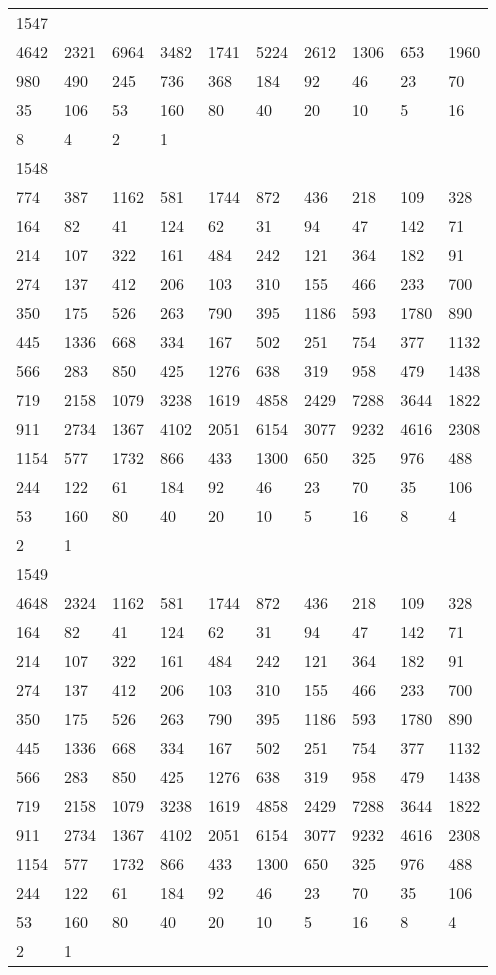 \begin{longtable}{*{10}{l}}
1547&&&&&&&&&\\
4642& 2321& 6964& 3482& 1741& 5224& 2612& 1306& 653& 1960\\
980& 490& 245& 736& 368& 184& 92& 46& 23& 70\\
35& 106& 53& 160& 80& 40& 20& 10& 5& 16\\
8& 4& 2& 1& \\

1548&&&&&&&&&\\
774& 387& 1162& 581& 1744& 872& 436& 218& 109& 328\\
164& 82& 41& 124& 62& 31& 94& 47& 142& 71\\
214& 107& 322& 161& 484& 242& 121& 364& 182& 91\\
274& 137& 412& 206& 103& 310& 155& 466& 233& 700\\
350& 175& 526& 263& 790& 395& 1186& 593& 1780& 890\\
445& 1336& 668& 334& 167& 502& 251& 754& 377& 1132\\
566& 283& 850& 425& 1276& 638& 319& 958& 479& 1438\\
719& 2158& 1079& 3238& 1619& 4858& 2429& 7288& 3644& 1822\\
911& 2734& 1367& 4102& 2051& 6154& 3077& 9232& 4616& 2308\\
1154& 577& 1732& 866& 433& 1300& 650& 325& 976& 488\\
244& 122& 61& 184& 92& 46& 23& 70& 35& 106\\
53& 160& 80& 40& 20& 10& 5& 16& 8& 4\\
2& 1& \\

1549&&&&&&&&&\\
4648& 2324& 1162& 581& 1744& 872& 436& 218& 109& 328\\
164& 82& 41& 124& 62& 31& 94& 47& 142& 71\\
214& 107& 322& 161& 484& 242& 121& 364& 182& 91\\
274& 137& 412& 206& 103& 310& 155& 466& 233& 700\\
350& 175& 526& 263& 790& 395& 1186& 593& 1780& 890\\
445& 1336& 668& 334& 167& 502& 251& 754& 377& 1132\\
566& 283& 850& 425& 1276& 638& 319& 958& 479& 1438\\
719& 2158& 1079& 3238& 1619& 4858& 2429& 7288& 3644& 1822\\
911& 2734& 1367& 4102& 2051& 6154& 3077& 9232& 4616& 2308\\
1154& 577& 1732& 866& 433& 1300& 650& 325& 976& 488\\
244& 122& 61& 184& 92& 46& 23& 70& 35& 106\\
53& 160& 80& 40& 20& 10& 5& 16& 8& 4\\
2& 1& \\


\end{longtable}
